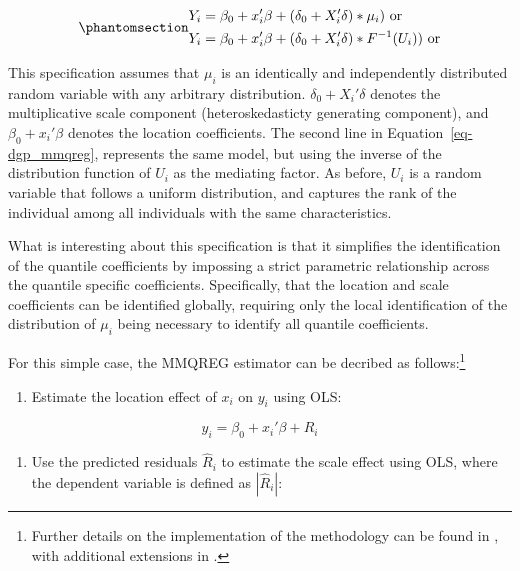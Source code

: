 \documentclass[bib]{statapress}
\providecommand{\tightlist}{%
  \setlength{\itemsep}{0pt}\setlength{\parskip}{0pt}}\usepackage{longtable,booktabs,array}
\begin{document}
\begin{equation}\phantomsection\label{eq-dgp_mmqreg}{\begin{aligned}
Y_{i} &= \beta_0 + x_{i}' \beta + (\delta_0 + X_{i}' \delta)*\mu_i) \text{ or} \\
Y_{i} &= \beta_0 + x_{i}' \beta + (\delta_0 + X_{i}' \delta)*F^{-1}(U_i)) \text{ or} 
\end{aligned}
}\end{equation}

This specification assumes that \(\mu_i\) is an identically and
independently distributed random variable with any arbitrary
distribution. \(\delta_0 + X_{i}' \delta\) denotes the multiplicative
scale component (heteroskedasticty generating component), and
\(\beta_0 + x_{i}' \beta\) denotes the location coefficients. The second
line in Equation~\ref{eq-dgp_mmqreg}, represents the same model, but
using the inverse of the distribution function of \(U_i\) as the
mediating factor. As before, \(U_i\) is a random variable that follows a
uniform distribution, and captures the rank of the individual among all
individuals with the same characteristics.

What is interesting about this specification is that it simplifies the
identification of the quantile coefficients by impossing a strict
parametric relationship across the quantile specific coefficients.
Specifically, that the location and scale coefficients can be identified
globally, requiring only the local identification of the distribution of
\(\mu_i\) being necessary to identify all quantile coefficients.

For this simple case, the MMQREG estimator can be decribed as
follows:\footnote{Further details on the implementation of the
  methodology can be found in \citet{mss2019}, with additional
  extensions in \citet{riosavila2024}.}

\begin{enumerate}
\def\labelenumi{\arabic{enumi}.}
\tightlist
\item
  Estimate the location effect of \(x_{i}\) on \(y_{i}\) using OLS:
\end{enumerate}

\[y_{i} = \beta_0 + x_{i}' \beta + R_i\]

\begin{enumerate}
\def\labelenumi{\arabic{enumi}.}
\setcounter{enumi}{1}
\tightlist
\item
  Use the predicted residuals \(\hat R_i\) to estimate the scale effect
  using OLS, where the dependent variable is defined as \(|\hat R_i|\):
\end{enumerate}
\end{document}
